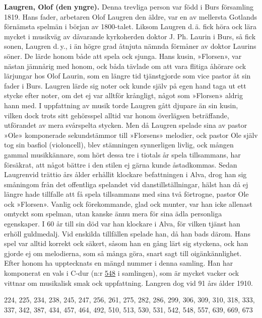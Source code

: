 \textbf{Laugren, Olof (den yngre).} Denna trevliga person var född i Burs församling 1819.
Hans fader, arbetaren Olof Laugren den äldre, var en av mellersta Gotlands förnämsta spelmän i början av 1800-talet. Liksom Laugren d.\,ä. fick höra ock lära mycket i musikväg av dåvarande kyrkoherden doktor J. Ph. Laurin i Burs, så fick sonen, Laugren d.\,y., i än högre grad åtnjuta nämnda förmåner av doktor Laurins söner. De lärde honom både att spela ock sjunga. Hans kusin, »Florsen», var nästan jämnårig med honom, ock båda tävlade om att vara flitiga åhörare ock lärjungar hos Olof Laurin, som en längre tid tjänstgjorde som vice pastor åt sin fader i Burs. Laugren lärde sig noter ock kunde själv på egen hand taga ut ett stycke efter noter, om det ej var alltför krångligt, något som »Florsen» aldrig hann med. I uppfattning av musik torde Laugren gått djupare än sin kusin, vilken dock trots sitt gehörsspel alltid var honom överlägsen beträffande, utförandet av mera svårspelta stycken. Men då Laugren spelade sina av pastor »Ole» komponerade sekundstämmor till »Florsens» melodier, ock pastor Ole själv tog sin basfiol (violoncell), blev stämningen synnerligen livlig, ock mången gammal musikkännare, som hört dessa tre i tiotals år spela tillsammans, har försäkrat, att något bättre i den stilen ej gärna kunde åstadkommas.
Sedan Laugrenvid trättio års ålder erhållit klockare befattningen i Alva, drog han sig småningom från det offentliga spelandet vid danstillställningar, hälst han då ej längre hade tillfalle att få spela tillsammans med sina två förtrogne, pastor Ole ock »Florsen». Vanlig ock förekommande, glad ock munter, var han icke allenast omtyckt som spelman, utan kanske ännu mera för sina ädla personliga egenskaper. I 60 år till sin död var han klockare i Alva, för vilken tjänst han erhöll guldmedalj. Vid enskilda tillfällen spelade han, då han bads därom. Hans spel var alltid korrekt ock säkert, såsom han en gång lärt sig styckena, ock han gjorde ej om melodierna, som så många göra, snart sagt till oigänkännlighet. Efter honom ha upptecknats en mängd nummer i denna samling. Han har komponerat en vals i C-dur (n:r \href{548}{548} i samlingen), som är mycket vacker ock vittnar om musikalisk smak ock uppfattning. Langren dog vid 91 års ålder 1910. 

224, 225, 234, 238, 245, 247, 256, 261, 275, 282, 286, 299, 306, 309, 310, 318, 333, 337, 342, 387, 434, 457, 464, 492, 510, 513, 530, 531, 542, 548, 557, 639, 669, 673 
